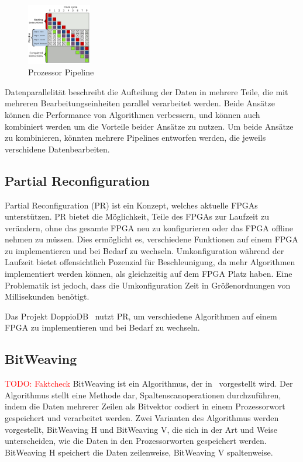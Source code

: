 \documentclass[conference]{IEEEtran}
\newcommand{\todo}[1]{\textcolor{red}{TODO: #1}}
\begin{document}
\begin{figure}[htbp]
    \centering
    \includegraphics[width=0.25\textwidth]{imgs/pipeline.png}
    \caption{Prozessor Pipeline~\cite{wikipedia_pipeline}}
    \label{fig:pipeline }
\end{figure}

Datenparallelität beschreibt die Aufteilung der Daten in mehrere Teile, die mit mehreren Bearbeitungseinheiten parallel verarbeitet werden. Beide Ansätze können die Performance
von Algorithmen verbessern, und können auch kombiniert werden um die Vorteile beider Ansätze zu nutzen. Um beide Ansätze zu kombinieren, könnten mehrere Pipelines entworfen werden,
die jeweils verschidene Datenbearbeiten.



\subsection{Partial Reconfiguration}
Partial Reconfiguration (PR) ist ein Konzept, welches aktuelle FPGAs unterstützen. PR bietet die Möglichkeit, Teile des FPGAs zur Laufzeit zu verändern,
ohne das gesamte FPGA neu zu konfigurieren oder das FPGA offline nehmen zu müssen. Dies ermöglicht es, verschiedene Funktionen auf einem FPGA zu implementieren
und bei Bedarf zu wechseln. Umkonfiguration während der Laufzeit bietet offensichtlich Pozenzial für Beschleunigung, da mehr Algorithmen implementiert
werden können, als gleichzeitig auf dem FPGA Platz haben. Eine Problematik ist jedoch, dass die Umkonfiguration Zeit in Größenordnungen von Millisekunden benötigt.

Das Projekt DoppioDB~\cite{li_bitweaving_2013} nutzt PR, um verschiedene Algorithmen auf einem FPGA zu implementieren und bei Bedarf zu wechseln.

\subsection{BitWeaving}
\todo{Faktcheck}
BitWeaving ist ein Algorithmus, der in~\cite{li_bitweaving_2013} vorgestellt wird. Der Algorithmus stellt eine Methode dar, Spaltenscanoperationen durchzuführen, indem
die Daten mehrerer Zeilen als Bitvektor codiert in einem Prozessorwort gespeichert und verarbeitet werden. Zwei Varianten des Algorithmus werden vorgestellt, BitWeaving H und BitWeaving V,
die sich in der Art und Weise unterscheiden, wie die Daten in den Prozessorworten gespeichert werden. BitWeaving H speichert die Daten zeilenweise, BitWeaving V spaltenweise.
\end{document}
